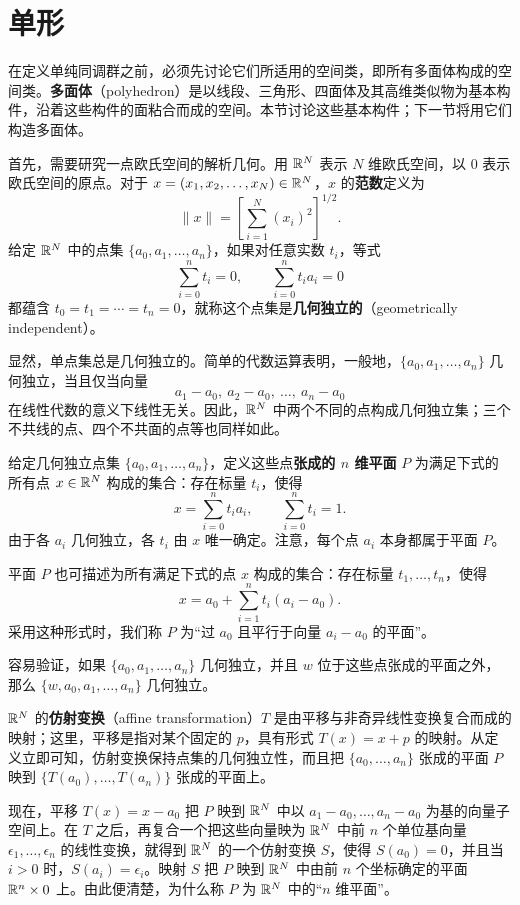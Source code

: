 \section{单形}
在定义单纯同调群之前，必须先讨论它们所适用的空间类，即所有多面体构成的空间类。\textbf{多面体}（polyhedron）是以线段、三角形、四面体及其高维类似物为基本构件，沿着这些构件的面粘合而成的空间。本节讨论这些基本构件；下一节将用它们构造多面体。

首先，需要研究一点欧氏空间的解析几何。用 $\mathbb{R}^N$ 表示 $N$ 维欧氏空间，以 $0$ 表示欧氏空间的原点。对于 $x=(x_1,x_2,\ldots,x_N)\in\mathbb{R}^N$，$x$ 的\textbf{范数}定义为
\[
\|x\|=\left[\sum_{i=1}^N(x_i)^2\right]^{1/2}.
\]
给定 $\mathbb{R}^N$ 中的点集 $\{a_0,a_1,\ldots,a_n\}$，如果对任意实数 $t_i$，等式
\[
\sum_{i=0}^n t_i=0,\qquad \sum_{i=0}^n t_i a_i=0
\]
都蕴含 $t_0=t_1=\cdots=t_n=0$，就称这个点集是\textbf{几何独立的}（geometrically independent）。

显然，单点集总是几何独立的。简单的代数运算表明，一般地，$\{a_0,a_1,\ldots,a_n\}$ 几何独立，当且仅当向量
\[
a_1-a_0,\ a_2-a_0,\ \ldots,\ a_n-a_0
\]
在线性代数的意义下线性无关。因此，$\mathbb{R}^N$ 中两个不同的点构成几何独立集；三个不共线的点、四个不共面的点等也同样如此。

给定几何独立点集 $\{a_0,a_1,\ldots,a_n\}$，定义这些点\textbf{张成的 $n$ 维平面} $P$ 为满足下式的所有点 $x\in\mathbb{R}^N$ 构成的集合：存在标量 $t_i$，使得
\[
x=\sum_{i=0}^n t_i a_i,\qquad \sum_{i=0}^n t_i=1.
\]
由于各 $a_i$ 几何独立，各 $t_i$ 由 $x$ 唯一确定。注意，每个点 $a_i$ 本身都属于平面 $P$。

平面 $P$ 也可描述为所有满足下式的点 $x$ 构成的集合：存在标量 $t_1,\ldots,t_n$，使得
\[
x=a_0+\sum_{i=1}^n t_i(a_i-a_0).
\]
采用这种形式时，我们称 $P$ 为“过 $a_0$ 且平行于向量 $a_i-a_0$ 的平面”。

容易验证，如果 $\{a_0,a_1,\ldots,a_n\}$ 几何独立，并且 $w$ 位于这些点张成的平面之外，那么 $\{w,a_0,a_1,\ldots,a_n\}$ 几何独立。

$\mathbb{R}^N$ 的\textbf{仿射变换}（affine transformation）$T$ 是由平移与非奇异线性变换复合而成的映射；这里，平移是指对某个固定的 $p$，具有形式 $T(x)=x+p$ 的映射。从定义立即可知，仿射变换保持点集的几何独立性，而且把 $\{a_0,\ldots,a_n\}$ 张成的平面 $P$ 映到 $\{T(a_0),\ldots,T(a_n)\}$ 张成的平面上。

现在，平移 $T(x)=x-a_0$ 把 $P$ 映到 $\mathbb{R}^N$ 中以 $a_1-a_0,\ldots,a_n-a_0$ 为基的向量子空间上。在 $T$ 之后，再复合一个把这些向量映为 $\mathbb{R}^N$ 中前 $n$ 个单位基向量 $\epsilon_1,\ldots,\epsilon_n$ 的线性变换，就得到 $\mathbb{R}^N$ 的一个仿射变换 $S$，使得 $S(a_0)=0$，并且当 $i>0$ 时，$S(a_i)=\epsilon_i$。映射 $S$ 把 $P$ 映到 $\mathbb{R}^N$ 中由前 $n$ 个坐标确定的平面 $\mathbb{R}^n\times0$ 上。由此便清楚，为什么称 $P$ 为 $\mathbb{R}^N$ 中的“$n$ 维平面”。

